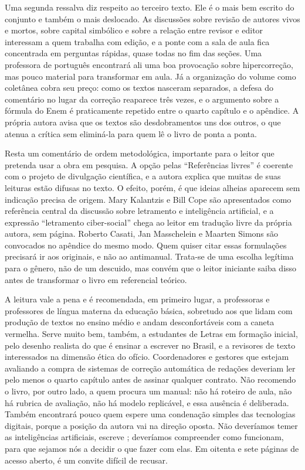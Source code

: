 \documentclass[portuguese]{textolivre}
\begin{document}
Uma segunda ressalva diz respeito ao terceiro texto. Ele é o mais bem escrito do conjunto e também o mais deslocado. As discussões sobre revisão de autores vivos e mortos, sobre capital simbólico e sobre a relação entre revisor e editor interessam a quem trabalha com edição, e a ponte com a sala de aula fica concentrada em perguntas rápidas, quase todas no fim das seções. Uma professora de português encontrará ali uma boa provocação sobre hipercorreção, mas pouco material para transformar em aula. Já a organização do volume como coletânea cobra seu preço: como os textos nasceram separados, a defesa do comentário no lugar da correção reaparece três vezes, e o argumento sobre a fórmula do Enem é praticamente repetido entre o quarto capítulo e o apêndice. A própria autora avisa que os textos são desdobramentos uns dos outros, o que atenua a crítica sem eliminá-la para quem lê o livro de ponta a ponta.

Resta um comentário de ordem metodológica, importante para o leitor que pretenda usar a obra em pesquisa. A opção pelas “Referências livres” é coerente com o projeto de divulgação científica, e a autora explica que muitas de suas leituras estão difusas no texto. O efeito, porém, é que ideias alheias aparecem sem indicação precisa de origem. Mary Kalantzis e Bill Cope são apresentados como referência central da discussão sobre letramento e inteligência artificial, e a expressão “letramento ciber-social” chega ao leitor em tradução livre da própria autora, sem página. Roberto Casati, Jan Masschelein e Maarten Simons são convocados no apêndice do mesmo modo. Quem quiser citar essas formulações precisará ir aos originais, e não ao antimanual. Trata-se de uma escolha legítima para o gênero, não de um descuido, mas convém que o leitor iniciante saiba disso antes de transformar o livro em referencial teórico.

A leitura vale a pena e é recomendada, em primeiro lugar, a professoras e professores de língua materna da educação básica, sobretudo aos que lidam com produção de textos no ensino médio e andam desconfortáveis com a caneta vermelha. Serve muito bem, também, a estudantes de Letras em formação inicial, pelo desenho realista do que é ensinar a escrever no Brasil, e a revisores de texto interessados na dimensão ética do ofício. Coordenadores e gestores que estejam avaliando a compra de sistemas de correção automática de redações deveriam ler pelo menos o quarto capítulo antes de assinar qualquer contrato. Não recomendo o livro, por outro lado, a quem procura um manual: não há roteiro de aula, não há rubrica de avaliação, não há modelo replicável, e essa ausência é deliberada. Também encontrará pouco quem espere uma condenação simples das tecnologias digitais, porque a posição da autora vai na direção oposta. Não deveríamos temer as inteligências artificiais, escreve \textcite[p.~65]{ribeiro2025escrever}; deveríamos compreender como funcionam, para que sejamos nós a decidir o que fazer com elas. Em oitenta e sete páginas de acesso aberto, é um convite difícil de recusar.
\end{document}
